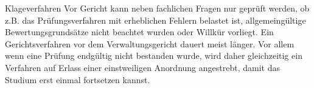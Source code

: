 \begin{artikel}{Klageverfahren}
Vor Gericht kann neben fachlichen Fragen nur geprüft werden, ob z.B. das Prüfungsverfahren mit erheblichen Fehlern belastet ist, allgemeingültige Bewertungsgrundsätze nicht beachtet wurden oder Willkür vorliegt. Ein Gerichtsverfahren vor dem Verwaltungsgericht dauert meist länger. Vor allem wenn eine Prüfung endgültig nicht bestanden wurde, wird daher gleichzeitig ein Verfahren auf Erlass einer einstweiligen Anordnung angestrebt, damit das Studium erst einmal fortsetzen kannst.
\end{artikel}
